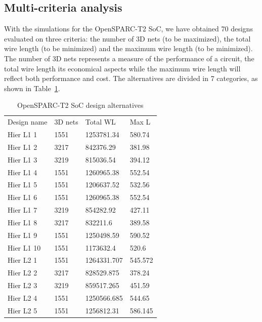 \documentclass{svmult}
\begin{document}


\subsection{Multi-criteria analysis}
With the simulations for the OpenSPARC-T2 SoC, we have obtained 70 designs evaluated on three criteria: the number of 3D nets (to be maximized), the total wire length (to be minimized) and the maximum wire length (to be minimized). The number of 3D nets represents a measure of the performance of a circuit, the total wire length its economical aspects while the maximum wire length will reflect both performance and cost. The alternatives are divided in 7 categories, as shown in Table~\ref{tab:alternatives}.

\begin{small}
\begin{longtable}{p{2.3cm}p{1.5cm}p{2cm}p{1.3cm}}
    \caption{OpenSPARC-T2 SoC design alternatives}
    \label{tab:alternatives}\vspace{-8pt}\\
    \hline
    Design name & 3D nets & Total WL & Max L\\
    \hline
    Hier L1 1 & 1551 & 1253781.34 & 580.74 \\
    Hier L1 2 & 3217 & 842376.29 & 381.98 \\
    Hier L1 3 & 3219 & 815036.54 & 394.12 \\
    Hier L1 4 & 1551 & 1260965.38 & 552.54 \\
    Hier L1 5 & 1551 & 1206637.52 & 532.56 \\
    Hier L1 6 & 1551 & 1260965.38 & 552.54 \\
    Hier L1 7 & 3219 & 854282.92 & 427.11 \\
    Hier L1 8 & 3217 & 832211.6 & 389.58 \\
    Hier L1 9 & 1551 & 1250498.59 & 590.52 \\
    Hier L1 10 & 1551 & 1173632.4 & 520.6 \\
    \hline
    Hier L2 1 & 1551 & 1264331.707 & 545.572 \\
    Hier L2 2 & 3217 & 828529.875 & 378.24 \\
    Hier L2 3 & 3219 & 859517.265 & 451.59 \\
    Hier L2 4 & 1551 & 1250566.685 & 544.65 \\
    Hier L2 5 & 1551 & 1256812.31 & 586.145 \\

\end{longtable}
\end{small}
\end{document}

